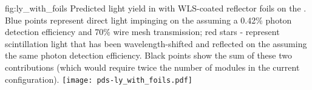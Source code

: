 \begin{dunefigure}{fig:ly_with_foils}
{Predicted light yield in with WLS-coated reflector foils on the . Blue points represent direct  light impinging on the  assuming a 0.42\% photon detection efficiency and 70\% wire mesh transmission; red stars - represent scintillation light that has been wavelength-shifted and reflected on the  assuming the same photon detection efficiency. Black points show the sum of these two contributions (which would require twice the number of  modules in the current  configuration).}
\texttt{[image: pds-ly\_with\_foils.pdf]}
\end{dunefigure}


	


